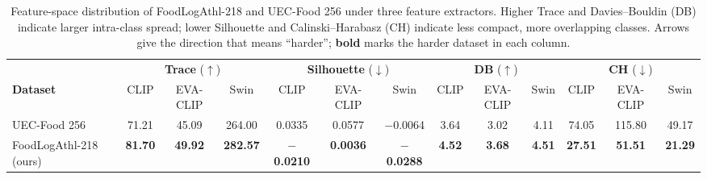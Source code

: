 \begin{table}[tb]
  \centering
  \caption{Feature-space distribution of FoodLogAthl-218 and UEC-Food 256 under three feature extractors. Higher Trace and Davies--Bouldin (DB) indicate larger intra-class spread; lower Silhouette and Calinski--Harabasz (CH) indicate less compact, more overlapping classes. Arrows give the direction that means ``harder''; \textbf{bold} marks the harder dataset in each column.}
  \footnotesize
  \setlength{\tabcolsep}{3pt}
  \begin{tabular}{@{}lcccccccccccc@{}}
      \toprule
        & \multicolumn{3}{c}{\textbf{Trace} ($\uparrow$)}
        & \multicolumn{3}{c}{\textbf{Silhouette} ($\downarrow$)}
        & \multicolumn{3}{c}{\textbf{DB} ($\uparrow$)}
        & \multicolumn{3}{c}{\textbf{CH} ($\downarrow$)} \\
      \cmidrule(lr){2-4} \cmidrule(lr){5-7} \cmidrule(lr){8-10} \cmidrule(l){11-13}
      \textbf{Dataset}
      & CLIP & EVA-CLIP & Swin
      & CLIP & EVA-CLIP & Swin
      & CLIP & EVA-CLIP & Swin
      & CLIP & EVA-CLIP & Swin \\
      \midrule
      UEC-Food 256
        & 71.21            & 45.09            & 264.00
        & 0.0335           & 0.0577           & $-$0.0064
        & 3.64             & 3.02             & 4.11
        & 74.05            & 115.80           & 49.17            \\
      FoodLogAthl-218 (ours)
        & \textbf{81.70}   & \textbf{49.92}   & \textbf{282.57}
        & \textbf{$-$0.0210} & \textbf{0.0036}  & \textbf{$-$0.0288}
        & \textbf{4.52}    & \textbf{3.68}    & \textbf{4.51}
        & \textbf{27.51}   & \textbf{51.51}   & \textbf{21.29}   \\
      \bottomrule
    \end{tabular}
  \label{table:diversity_metrics_comparison}
\end{table}
